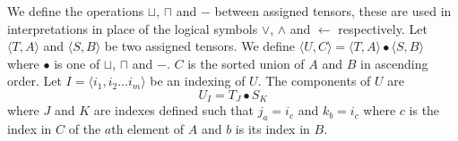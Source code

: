 \documentclass{article}
\begin{document}
We define the operations $\sqcup$, $\sqcap$ and $-$ between assigned
tensors, these are used in interpretations in place of the logical
symbols $\lor$, $\land$ and $\leftarrow$ respectively. Let $\langle
T, A\rangle$ and $\langle S, B\rangle$ be two assigned tensors. We
define $\langle U, C\rangle = \langle T, A\rangle \bullet \langle S,
B\rangle$ where $\bullet$ is one of $\sqcup$, $\sqcap$ and $-$. $C$ is
the sorted union of $A$ and $B$ in ascending order. Let $I = \langle
i_1, i_2 \ldots i_m\rangle$ be an indexing of $U$. The components
 of $U$ are
$$ U_I = T_J \bullet S_K$$
where $J$ and $K$ are indexes defined such that $j_a = i_c$ and $k_b =
i_c$ where $c$ is the index in $C$ of the $a$th element of $A$ and $b$
is its index in $B$.





\end{document}
